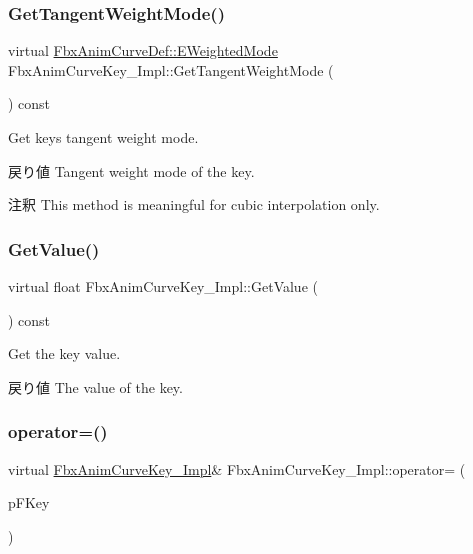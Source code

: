 \subsubsection{\texorpdfstring{Get\+Tangent\+Weight\+Mode()}{GetTangentWeightMode()}}
{\footnotesize\ttfamily virtual \hyperlink{class_fbx_anim_curve_def_aeee6e9cc12501e10dbd3e5caaf66990e}{Fbx\+Anim\+Curve\+Def\+::\+E\+Weighted\+Mode} Fbx\+Anim\+Curve\+Key\+\_\+\+Impl\+::\+Get\+Tangent\+Weight\+Mode (\begin{DoxyParamCaption}{ }\end{DoxyParamCaption}) const\hspace{0.3cm}{\ttfamily [pure virtual]}}

Get key\textquotesingle{}s tangent weight mode. \begin{DoxyReturn}{戻り値}
Tangent weight mode of the key. 
\end{DoxyReturn}
\begin{DoxyRemark}{注釈}
This method is meaningful for cubic interpolation only. 
\end{DoxyRemark}
\mbox{\label{class_fbx_anim_curve_key___impl_acf6a01e7679d11a13f6c919899c6d25d}} 
\subsubsection{\texorpdfstring{Get\+Value()}{GetValue()}}
{\footnotesize\ttfamily virtual float Fbx\+Anim\+Curve\+Key\+\_\+\+Impl\+::\+Get\+Value (\begin{DoxyParamCaption}{ }\end{DoxyParamCaption}) const\hspace{0.3cm}{\ttfamily [pure virtual]}}

Get the key value. \begin{DoxyReturn}{戻り値}
The value of the key. 
\end{DoxyReturn}
\mbox{\label{class_fbx_anim_curve_key___impl_a6d307ce9add998d6e24108c12557403f}} 
\subsubsection{\texorpdfstring{operator=()}{operator=()}}
{\footnotesize\ttfamily virtual \hyperlink{class_fbx_anim_curve_key___impl}{Fbx\+Anim\+Curve\+Key\+\_\+\+Impl}\& Fbx\+Anim\+Curve\+Key\+\_\+\+Impl\+::operator= (\begin{DoxyParamCaption}\item[{const \hyperlink{class_fbx_anim_curve_key___impl}{Fbx\+Anim\+Curve\+Key\+\_\+\+Impl} \&}]{p\+F\+Key }\end{DoxyParamCaption})\hspace{0.3cm}{\ttfamily [pure virtual]}}

